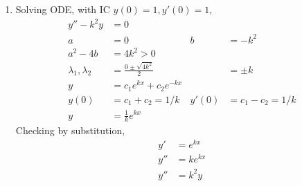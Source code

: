 \begin{enumerate}
    \item Solving ODE, with IC $ y(0) = 1 , y'(0) = 1$,
          \begin{align}
              y'' - k^{2}y             & = 0                               \\
              a                        & = 0                             &
              b                        & = -k^{2}                          \\
              a^{2} - 4b               & = 4k^{2} > 0                      \\
              \lambda_{1}, \lambda_{2} & = \frac{0 \pm \sqrt{4k^{2}}}{2} &
                                       & = \pm k                           \\
              y                        & = c_{1}e^{kx} + c_{2}e^{-kx}      \\
              y(0)                     & = c_{1} + c_{2} = 1/k           &
              y'(0)                    & = c_{1} - c_{2} = 1/k             \\
              y                        & = \frac{1}{k}e^{kx}
          \end{align}
          Checking by substitution,
          \begin{align}
              y'  & = e^{kx}  \\
              y'' & = ke^{kx} \\
              y'' & = k^{2}y
          \end{align}


\end{enumerate}
